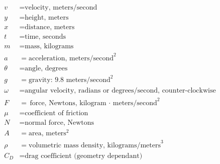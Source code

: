 \documentclass[12pt, letterpaper]{book}
\begin{document}
    \begin{align*}
        v       & = \text{velocity, meters/second}                                  \\
        y       & = \text{height, meters}                                           \\
        x       & = \text{distance, meters}                                         \\
        t       & = \text{time, seconds}                                            \\
        m       & = \text{mass, kilograms}                                          \\
        a       & = \text{acceleration, meters/second}^{2}                          \\
        \theta  & = \text{angle, degrees}                                           \\
        g       & = \text{gravity: 9.8 meters/second}^{2}                           \\
        \omega  & = \text{angular velocity, radians or degrees/second, counter-clockwise}\\
        F       & = \text{force, Newtons, kilogram $\cdot$ meters/second}^{2}       \\
        \mu     & = \text{coefficient of friction}                                  \\
        N       & = \text{normal force, Newtons}                                    \\
        A       & = \text{area, meters}^{2}                                         \\
        \rho    & = \text{volumetric mass density, kilograms/meters}^{3}            \\
        C_{D}   & = \text{drag coefficient (geometry dependant)}
    \end{align*}
\end{document}
